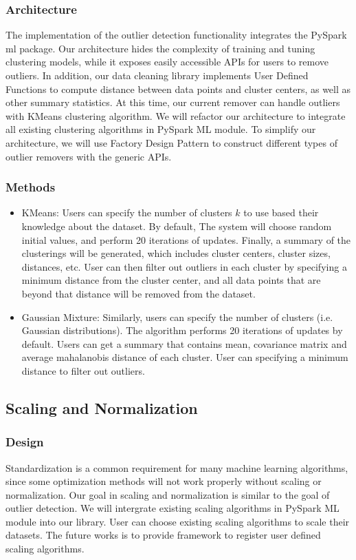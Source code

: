 \documentclass[sigconf]{acmart}
\begin{document}
\subsubsection{Architecture}
The implementation of the outlier detection functionality integrates the PySpark ml package. Our architecture hides the complexity of training and tuning clustering models, while it exposes easily accessible APIs for users to remove outliers. In addition, our data cleaning library implements User Defined Functions to compute distance between data points and cluster centers, as well as other summary statistics. At this time, our current remover can handle outliers with KMeans clustering algorithm. We will refactor our architecture to integrate all existing clustering algorithms in PySpark ML module. To simplify our architecture, we will use Factory Design Pattern to construct different types of outlier removers with the generic APIs.

\subsubsection{Methods}
\begin{itemize}
	\item{KMeans}\cite{KMeans}: Users can specify the number of clusters $k$ to use based their knowledge about the dataset. By default, The system will choose random initial values, and perform 20 iterations of updates. Finally, a summary of the clusterings will be generated, which includes cluster centers, cluster sizes, distances, etc. User can then filter out outliers in each cluster by specifying a minimum distance from the cluster center, and all data points that are beyond that distance will be removed from the dataset.
	\item{Gaussian Mixture}: Similarly, users can specify the number of clusters (i.e. Gaussian distributions). The algorithm performs 20 iterations of updates by default. Users can get a  summary that contains mean, covariance matrix and average mahalanobis distance of each cluster. User can specifying a minimum distance to filter out outliers.

\end{itemize}

\subsection{Scaling and Normalization}
\subsubsection{Design}
Standardization is a common requirement for many machine learning algorithms, since some optimization methods will not work properly without scaling or normalization\cite{convex}. Our goal in scaling and normalization is similar to the goal of outlier detection. We will intergrate existing scaling algorithms in PySpark ML module into our library. User can choose existing scaling algorithms to scale their datasets. The future works is to provide framework to register user defined scaling algorithms.
\end{document}
